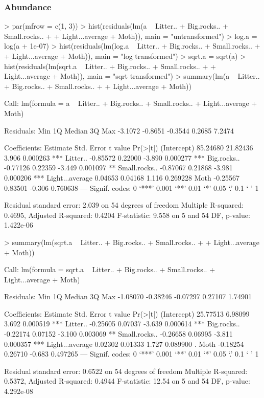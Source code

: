 \documentclass[a4paper]{article}
\begin{document}
\subsubsection{Abundance}
\begin{Schunk}
\begin{Sinput}
> par(mfrow = c(1, 3))
> hist(residuals(lm(a ~ Litter.. + Big.rocks.. + Small.rocks.. + 
+     Light...average + Moth)), main = "untransformed")
> log.a = log(a + 1e-07)
> hist(residuals(lm(log.a ~ Litter.. + Big.rocks.. + Small.rocks.. + 
+     Light...average + Moth)), main = "log transformed")
> sqrt.a = sqrt(a)
> hist(residuals(lm(sqrt.a ~ Litter.. + Big.rocks.. + Small.rocks.. + 
+     Light...average + Moth)), main = "sqrt transformed")
> summary(lm(a ~ Litter.. + Big.rocks.. + Small.rocks.. + 
+     Light...average + Moth))
\end{Sinput}
\begin{Soutput}
Call:
lm(formula = a ~ Litter.. + Big.rocks.. + Small.rocks.. + Light...average + 
    Moth)

Residuals:
    Min      1Q  Median      3Q     Max 
-3.1072 -0.8651 -0.3544  0.2685  7.2474 

Coefficients:
                Estimate Std. Error t value Pr(>|t|)    
(Intercept)     85.24680   21.82436   3.906 0.000263 ***
Litter..        -0.85572    0.22000  -3.890 0.000277 ***
Big.rocks..     -0.77126    0.22359  -3.449 0.001097 ** 
Small.rocks..   -0.87067    0.21868  -3.981 0.000206 ***
Light...average  0.04653    0.04168   1.116 0.269228    
Moth            -0.25567    0.83501  -0.306 0.760638    
---
Signif. codes:  0 ‘***’ 0.001 ‘**’ 0.01 ‘*’ 0.05 ‘.’ 0.1 ‘ ’ 1 

Residual standard error: 2.039 on 54 degrees of freedom
Multiple R-squared: 0.4695,	Adjusted R-squared: 0.4204 
F-statistic: 9.558 on 5 and 54 DF,  p-value: 1.422e-06 
\end{Soutput}
\begin{Sinput}
> summary(lm(sqrt.a ~ Litter.. + Big.rocks.. + Small.rocks.. + 
+     Light...average + Moth))
\end{Sinput}
\begin{Soutput}
Call:
lm(formula = sqrt.a ~ Litter.. + Big.rocks.. + Small.rocks.. + 
    Light...average + Moth)

Residuals:
     Min       1Q   Median       3Q      Max 
-1.08070 -0.38246 -0.07297  0.27107  1.74901 

Coefficients:
                Estimate Std. Error t value Pr(>|t|)    
(Intercept)     25.77513    6.98099   3.692 0.000519 ***
Litter..        -0.25605    0.07037  -3.639 0.000614 ***
Big.rocks..     -0.22174    0.07152  -3.100 0.003069 ** 
Small.rocks..   -0.26658    0.06995  -3.811 0.000357 ***
Light...average  0.02302    0.01333   1.727 0.089900 .  
Moth            -0.18254    0.26710  -0.683 0.497265    
---
Signif. codes:  0 ‘***’ 0.001 ‘**’ 0.01 ‘*’ 0.05 ‘.’ 0.1 ‘ ’ 1 

Residual standard error: 0.6522 on 54 degrees of freedom
Multiple R-squared: 0.5372,	Adjusted R-squared: 0.4944 
F-statistic: 12.54 on 5 and 54 DF,  p-value: 4.292e-08 
\end{Soutput}
\end{Schunk}
\end{document}
